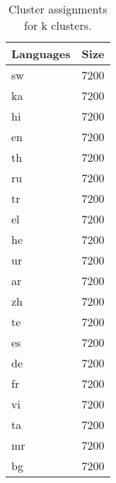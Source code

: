 \begin{table}
\caption{Cluster assignments for {k} clusters.}
\label{tab:chung_clusters_k20}
\begin{tabular}{lr}
\toprule
Languages & Size \\
\midrule
sw & 7200 \\
ka & 7200 \\
hi & 7200 \\
en & 7200 \\
th & 7200 \\
ru & 7200 \\
tr & 7200 \\
el & 7200 \\
he & 7200 \\
ur & 7200 \\
ar & 7200 \\
zh & 7200 \\
te & 7200 \\
es & 7200 \\
de & 7200 \\
fr & 7200 \\
vi & 7200 \\
ta & 7200 \\
mr & 7200 \\
bg & 7200 \\
\bottomrule
\end{tabular}
\end{table}
